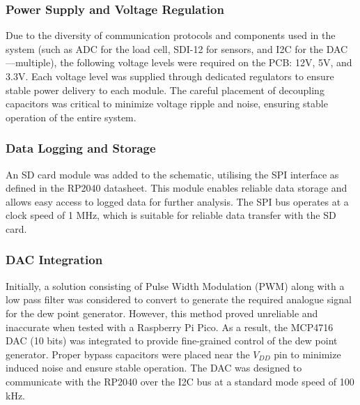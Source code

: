 \subsubsection{Power Supply and Voltage Regulation}

Due to the diversity of communication protocols 
and components used in the system (such as ADC for the load cell, SDI-12 for sensors, and I2C 
for the DAC—multiple), the following voltage levels were required on the PCB: 12V, 5V, and 3.3V. Each voltage 
level was supplied through dedicated regulators to ensure stable power delivery to each module. 
The careful placement of decoupling capacitors was critical to minimize voltage ripple and noise, 
ensuring stable operation of the entire system.

\subsubsection{Data Logging and Storage}

An SD card module was added to the schematic, utilising the 
SPI interface as defined in the RP2040 datasheet. This module enables reliable data storage 
and allows easy access to logged data for further analysis. The SPI bus operates at a clock 
speed of 1 MHz, which is suitable for reliable data transfer with the SD card.

\subsubsection{DAC Integration}

Initially, a solution consisting of Pulse Width Modulation (PWM) 
along with a low pass filter was considered to convert to generate the required analogue signal 
for the dew point generator. However, this method proved unreliable and inaccurate when tested 
with a Raspberry Pi Pico. As a result, the MCP4716 DAC (10 bits) was integrated to provide fine-grained control of 
the dew point generator. Proper bypass capacitors were placed near the $V_{DD}$ pin 
to minimize induced noise and ensure stable operation. The DAC was designed to communicate with the RP2040 
over the I2C bus at a standard mode speed of 100 kHz.